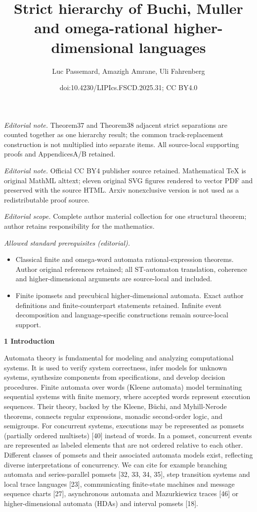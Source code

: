 \documentclass[10pt,a4paper]{article}
\title{Strict hierarchy of Buchi, Muller and omega-rational higher-dimensional languages}
\author{Luc Passemard, Amazigh Amrane, Uli Fahrenberg}
\date{doi:10.4230/LIPIcs.FSCD.2025.31; CC BY4.0}
\begin{document}
\maketitle
\noindent\textit{Editorial note.} Theorem37 and Theorem38 adjacent strict separations are counted together as one hierarchy result; the common track-replacement construction is not multiplied into separate items. All source-local supporting proofs and AppendicesA/B retained.\par\medskip
\noindent\textit{Editorial note.} Official CC BY4 publisher source retained. Mathematical TeX is original MathML alttext; eleven original SVG figures rendered to vector PDF and preserved with the source HTML. Arxiv nonexclusive version is not used as a redistributable proof source.\par\medskip
\noindent\textit{Editorial scope.} Complete author material collection for one structural theorem; author retains responsibility for the mathematics.\par\medskip
\noindent\textit{Allowed standard prerequisites (editorial).}\begin{itemize}
\item Classical finite and omega-word automata rational-expression theorems. Author original references retained; all ST-automaton translation, coherence and higher-dimensional arguments are source-local and included.
\item Finite ipomsets and precubical higher-dimensional automata. Exact author definitions and finite-counterpart statements retained. Infinite event decomposition and language-specific constructions remain source-local support.
\end{itemize}\medskip

 
\par\medskip\noindent\textbf{1 Introduction}\par
 
 
Automata theory is fundamental for modeling and analyzing computational systems. It is used to verify system correctness, infer models for unknown systems, synthesize components from specifications, and develop decision procedures. Finite automata over words (Kleene automata) model terminating sequential systems with finite memory, where accepted words represent execution sequences. Their theory, backed by the Kleene, Büchi, and Myhill-Nerode theorems, connects regular expressions, monadic second-order logic, and semigroups. For concurrent systems, executions may be represented as pomsets (partially ordered multisets) [40] instead of words. In a pomset, concurrent events are represented as labeled elements that are not ordered relative to each other. Different classes of pomsets and their associated automata models exist, reflecting diverse interpretations of concurrency. We can cite for example branching automata and series-parallel pomsets [32, 33, 34, 35], step transition systems and local trace languages [23], communicating finite-state machines and message sequence charts [27], asynchronous automata and Mazurkiewicz traces [46] or higher-dimensional automata (HDAs) and interval pomsets [18].\par
 
\end{document}
